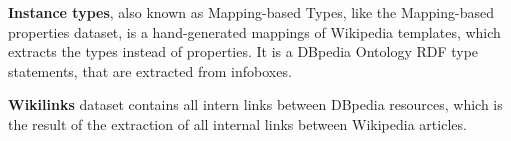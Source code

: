 \documentclass[10pt,a4paper]{article}
\newcommand{\todo}[1]{{\color{red}\textsf{\textbf{TODO}}: #1}}
\begin{document}
\textbf{Instance types}, also known as Mapping-based Types, like the Mapping-based properties dataset, is a hand-generated mappings of Wikipedia templates, which extracts the types instead of properties. It is a DBpedia Ontology RDF type statements, that are extracted from infoboxes.

\textbf{Wikilinks} dataset contains all intern links between DBpedia resources, which is the result of the extraction of all internal links between Wikipedia articles.







\end{document}
